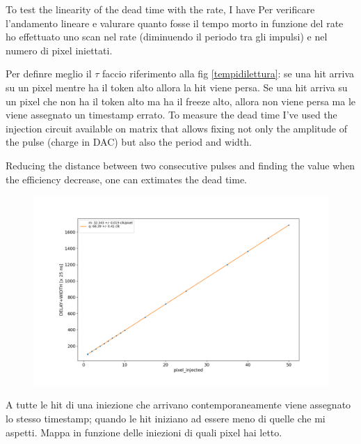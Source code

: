         To test the linearity of the dead time with the rate, I have 
        Per verificare l'andamento lineare e valurare quanto fosse il tempo morto in funzione del rate ho effettuato uno scan nel rate (diminuendo il periodo tra gli impulsi) e nel numero di pixel iniettati. 

 
        Per definre meglio il $\tau$ faccio riferimento alla fig \ref{tempidilettura}: se una hit arriva su un pixel mentre ha il token alto allora la hit viene persa. Se una hit arriva su un pixel che non ha il token alto ma ha il freeze alto, allora non viene persa ma le viene assegnato un timestamp errato. 
        To measure the dead time I've used the injection circuit available on matrix that allows fixing not only the amplitude of the pulse (charge in DAC) but also the period and width. 

        Reducing the distance between two consecutive pulses and finding the value when the efficiency decrease, one can extimates the dead time. 

        \begin{figure}[h!]
                \centering
                \includegraphics[width=.7\linewidth]{figures/Monopix1/dead_time.png}
                \caption{}
                \label{fig:dead_time}
            \end{figure}
        A tutte le hit di una iniezione che arrivano contemporaneamente viene assegnato lo stesso timestamp; quando le hit iniziano ad essere meno di quelle che mi aspetti.
        Mappa in funzione delle iniezioni di quali pixel hai letto.
        
    
